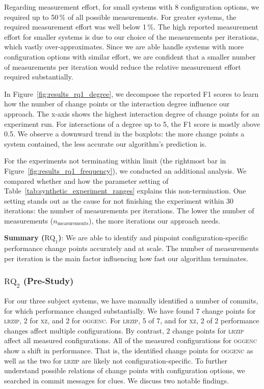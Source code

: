 \documentclass[sigconf]{acmart}
\newcommand{\greybox}[1]{
	\begin{mdframed}[backgroundcolor=black!10!white,linewidth=0pt,backgroundcolor=indigo2!10,linewidth=0pt,innerleftmargin=5pt,innertopmargin=5pt]
		#1
	\end{mdframed}
}
\begin{document}
	Regarding measurement effort, for small systems with 8 configuration options, we required up to 50\,\% of all possible measurements. For greater systems, the required measurement effort was well below 1\,\%. The high reported measurement effort for smaller systems is due to our choice of the measurements per iterations, which vastly over-approximates. Since we are able handle systems with more configuration options with similar effort, we are confident that a smaller number of measurements per iteration would reduce the relative measurement effort required substantially.
	
	In Figure~\ref{fig:results_rq1_degree}, we decompose the reported F1 scores to learn how the number of change points or the interaction degree influence our approach. The x-axis shows the highest interaction degree of change points for an experiment run. For interactions of a degree up to 5, the F1 score is mostly above 0.5. We observe a downward trend in the boxplots: the more change points a system contained, the less accurate our algorithm's prediction is.
	
	For the experiments not terminating within limit (the rightmost bar in Figure~\ref{fig:results_rq1_frequency}), we conducted an additional analysis. We compared whether and how the parameter setting of Table~\ref{tab:synthetic_experiment_ranges} explains this non-termination. One setting stands out as the cause for not finishing the experiment within 30 iterations: the number of measurements per iterations. The lower the number of measurements ($n_\text{measurements}$), the more iterations our approach needs.
	\vspace{2mm}
	\greybox{
		\textbf{Summary ($\text{RQ}_1$)}: We are able to identify and pinpoint config\-uration-specific performance change points accurately and at scale. The number of measurements per iteration is the main factor influencing how fast our algorithm terminates.
	}
	
	\subsubsection{$\text{RQ}_2$ (Pre-Study)}
	For our three subject systems, we have manually identified a number of commits, for which performance chang\-ed substantially. We have found 7 change points for \textsc{lrzip}, 2 for \textsc{xz}, and 2 for \textsc{oggenc}. For \textsc{lrzip}, 5 of 7, and for \textsc{xz}, 2 of 2 performance changes affect multiple configurations. By contrast, 2 change points for \textsc{lrzip} affect all measured configurations. All of the measured configurations for \textsc{oggenc} show a shift in performance. That is, the identified change points for \textsc{oggenc} as well as the two for \textsc{lrzip} are likely not configuration-specific. 	
	To further understand possible relations of change points with configuration options, we searched in commit messages for clues. We discuss two notable findings. 
	
\end{document}
